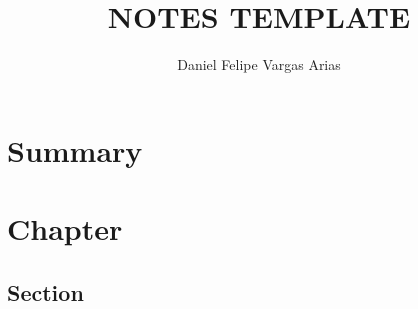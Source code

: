 \documentclass[twocolumn]{report}
\title{NOTES TEMPLATE}
\author{Daniel Felipe Vargas Arias}
\date{}
\begin{document}
\maketitle
\tableofcontents

\chapter*{Summary}

\chapter{Chapter}

\section{Section}
\end{document}
